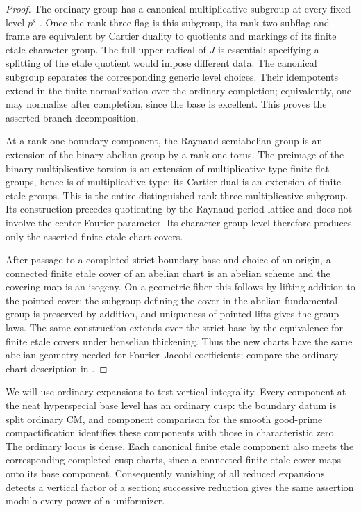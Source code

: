 \begin{proof}
The ordinary group has a canonical multiplicative subgroup at every
fixed level $p^s$
\citep[proof of Theorem~2.1, pp.~149--150]{Katz1981SerreTate}.
Once the rank-three flag is this subgroup, its
rank-two subflag and frame are equivalent by Cartier duality to
quotients and markings of its finite etale character group.  The full
upper radical of $J$ is essential: specifying a splitting of the etale
quotient would impose different data.  The canonical subgroup
separates the corresponding generic level choices.  Their idempotents
extend in the finite normalization over the ordinary completion;
equivalently, one may normalize after completion, since the base is
excellent.  This proves the asserted branch decomposition.

At a rank-one boundary component, the Raynaud semiabelian group is
an extension of the binary abelian group by a rank-one torus.  The
preimage of the binary multiplicative torsion is an extension of
multiplicative-type finite flat groups, hence is of multiplicative
type: its Cartier dual is an extension of finite etale groups.  This
is the entire distinguished rank-three multiplicative subgroup.  Its
construction precedes quotienting by the Raynaud period lattice and
does not involve the center Fourier parameter.  Its character-group
level therefore produces only the asserted finite etale chart
covers.

After passage to a completed strict boundary base and choice of an
origin, a connected finite etale cover of an abelian chart is an
abelian scheme and the covering map is an isogeny.  On a geometric
fiber this follows by lifting addition to the pointed cover: the
subgroup defining the cover in the abelian fundamental group is
preserved by addition, and uniqueness of pointed lifts gives the
group laws.  The same construction extends over the strict base by
the equivalence for finite etale covers under henselian thickening.
Thus the new charts have the same abelian geometry needed for
Fourier--Jacobi coefficients; compare the ordinary chart description
in \citet[Proposition~4.2.1.34 and Corollary~4.2.1.36]{Lan2018Ordinary}.
\end{proof}

We will use ordinary expansions to test vertical integrality.
Every component at the neat hyperspecial base level has an ordinary
cusp: the boundary datum is split ordinary CM, and component
comparison for the smooth good-prime compactification identifies
these components with those in characteristic zero.  The ordinary
locus is dense.  Each canonical finite etale component also meets
the corresponding completed cusp charts, since a connected finite
etale cover maps onto its base component.  Consequently vanishing
of all reduced expansions detects a vertical factor of a section;
successive reduction gives the same assertion modulo every power
of a uniformizer.


